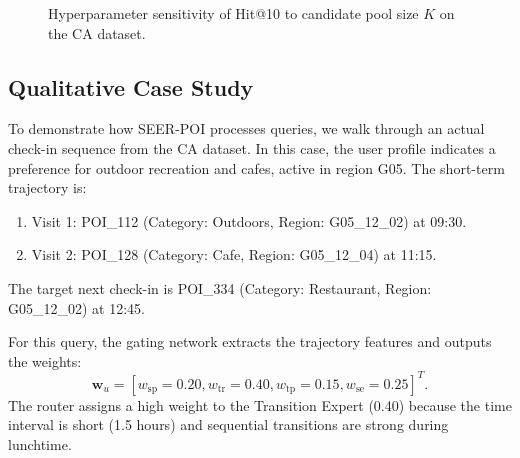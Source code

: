 \documentclass[10pt,twocolumn]{article}
\newcommand{\method}{SEER-POI}
\begin{document}
\begin{figure}[h]
\centering
\noindent{}
\caption{Hyperparameter sensitivity of Hit@10 to candidate pool size $K$ on the CA dataset.}
\label{fig:hparams}
\end{figure}

\subsection{Qualitative Case Study}
To demonstrate how \method{} processes queries, we walk through an actual check-in sequence from the CA dataset. In this case, the user profile indicates a preference for outdoor recreation and cafes, active in region G05. The short-term trajectory is:
\begin{enumerate}
    \item Visit 1: POI\_112 (Category: Outdoors, Region: G05\_12\_02) at 09:30.
    \item Visit 2: POI\_128 (Category: Cafe, Region: G05\_12\_04) at 11:15.
\end{enumerate}
The target next check-in is POI\_334 (Category: Restaurant, Region: G05\_12\_02) at 12:45.

For this query, the gating network extracts the trajectory features and outputs the weights:
\begin{equation}
    \mathbf{w}_u = [w_{\mathrm{sp}}=0.20, w_{\mathrm{tr}}=0.40, w_{\mathrm{tp}}=0.15, w_{\mathrm{se}}=0.25]^T.
\end{equation}
The router assigns a high weight to the Transition Expert (0.40) because the time interval is short (1.5 hours) and sequential transitions are strong during lunchtime. 
\end{document}
